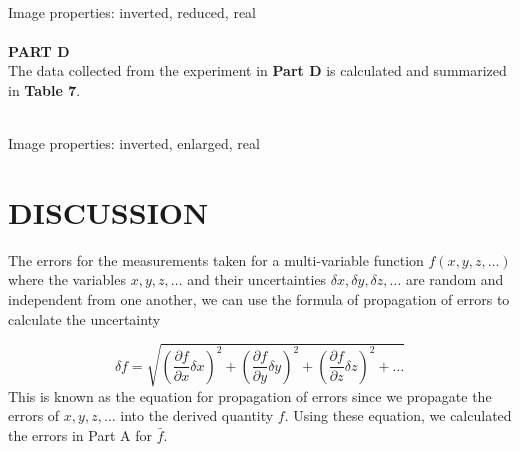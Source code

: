 \documentclass[a4paper,11pt]{article}
\begin{document}
\\
\noindent Image properties: inverted, reduced, real\\	
\\		
\newpage
\noindent\textbf{PART D}
\\
The data collected from the experiment in \textbf{Part D} is calculated and summarized in \textbf{Table 7}.
\\
\begin{table}[h!]
\centering
\caption{Experimental data for Part D}
\label{your-label}
\end{table}
\\
\noindent Image properties: inverted, enlarged, real\\		
\newpage
{}
\section*{\center DISCUSSION}
\label{sec:DISCUSSION}
\qquad 
The errors for the measurements taken for a multi-variable function \(f(x,y,z,\ldots)\) where the variables \(x,y,z,\ldots\) and their uncertainties \(\delta x, \delta y, \delta z, \ldots\) are random and independent from one another, we can use the formula
of propagation of errors  to calculate the uncertainty

\begin{equation*}
\delta f = \sqrt{
\left( \frac{\partial f}{\partial x} \delta x \right)^2 +
\left( \frac{\partial f}{\partial y} \delta y \right)^2 +
\left( \frac{\partial f}{\partial z} \delta z \right)^2 +
\ldots
}
\end{equation*}
This is known as the equation for propagation of errors since we propagate the errors of \(x,y,z,\ldots\) into the derived quantity \(f\). Using these equation, we calculated the errors in Part A for \(\bar{f}\).\\
\end{document}
